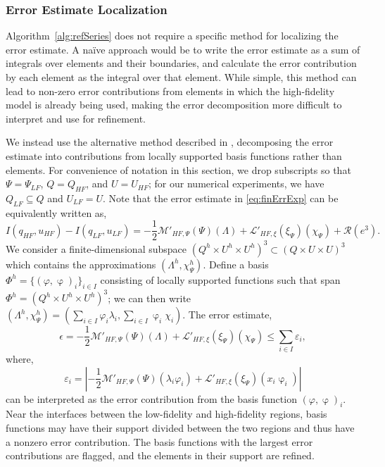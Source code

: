 \subsubsection{Error Estimate Localization}\label{sect:error_est_localize}
%
Algorithm~\cref{alg:refSeries} does not require a specific method for localizing the error estimate. A na\"{i}ve approach would be to write the error estimate as a sum of integrals over elements and their boundaries, and calculate the error contribution by each element as the integral over that element. While simple, this method can lead to non-zero error contributions from elements in which the high-fidelity model is already being used, making the error decomposition more difficult to interpret and use for refinement.

We instead use the alternative method described in \cite{vanOpstaletal15}, decomposing the error estimate into contributions from locally supported basis functions rather than elements. For convenience of notation in this section, we drop subscripts so that $\Psi=\Psi_{LF}$, $Q=Q_{HF}$, and $U=U_{HF}$; for our numerical experiments, we have $Q_{LF}\subseteq Q$ and $U_{LF}=U$. Note that the error estimate in \cref{eq:finErrExp} can be equivalently written as,
%
\begin{equation}
I(q_{HF},u_{HF})-I(q_{LF},u_{LF})=-\frac{1}{2}\mathcal{M}'_{HF,\Psi}(\Psi)(\Lambda)+\mathcal{L}'_{HF,\xi}(\xi_\Psi)(\chi_\Psi)+\mathcal{R}(e^3). \nonumber
\end{equation}
%
We consider a finite-dimensional  subspace $(Q^h\times U^h\times U^h)^3 \subset (Q\times U\times U)^3$ which contains the approximations $(\Lambda^h,\chi_\Psi^h)$. Define a basis $\Phi^h=\{(\varphi,\upvarphi)_i\}_{i\in I}$ consisting of locally supported functions such that span $\Phi^h=(Q^h\times U^h\times U^h)^3$; we can then write $(\Lambda^h,\chi_\Psi^h)=(\sum\limits_{i\in I}\varphi_i\lambda_i,\sum\limits_{i\in I}\upvarphi_i \chi_i)$. The error estimate,
%
\begin{equation}
\epsilon = -\frac{1}{2}\mathcal{M}'_{HF,\Psi}(\Psi)(\Lambda)+\mathcal{L}'_{HF,\xi}(\xi_\Psi)(\chi_\Psi) \leq \sum_{i\in I} \varepsilon_i,
\end{equation}
%
where,
%
\begin{equation}\label{eq:basisblame}
\varepsilon_i = \left| -\frac{1}{2}\mathcal{M}'_{HF,\Psi}(\Psi)(\lambda_i\varphi_i)+\mathcal{L}'_{HF,\xi}(\xi_\Psi)(x_i\upvarphi_i) \right|
\end{equation}
%
can be interpreted as the error contribution from the basis function $(\varphi,\upvarphi)_i$. Near the interfaces between the low-fidelity and high-fidelity regions, basis functions may have their support divided between the two regions and thus have a nonzero error contribution. The basis functions with the largest error contributions are flagged, and the elements in their support are refined.  
% 
